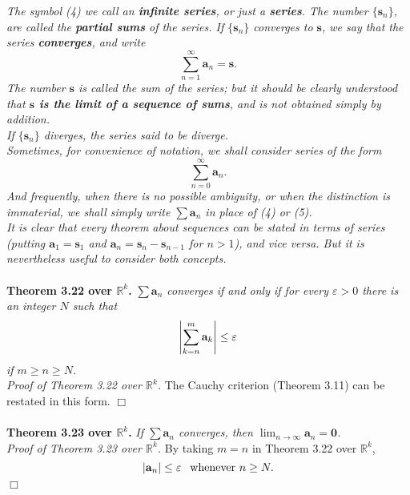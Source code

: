 \documentclass{article}
\begin{document}
\emph{The symbol (4) we call an \textbf{infinite series}, or just a \textbf{series}.
The number $\{ \mathbf{s}_n \}$, are called the \textbf{partial sums} of the series.
If $\{ \mathbf{s}_n \}$ converges to $\mathbf{s}$,
we say that the series \textbf{converges}, and write
\[
  \sum_{n=1}^{\infty} \mathbf{a}_n = \mathbf{s}.
\]
The number $\mathbf{s}$ is called the sum of the series;
but it should be clearly understood that
\textbf{$\mathbf{s}$ is the limit of a sequence of sums},
and is not obtained simply by addition.} \\

\emph{If $\{ \mathbf{s}_n \}$ diverges, the series said to be diverge.} \\

\emph{Sometimes, for convenience of notation, we shall consider series of the form
\[
  \sum_{n=0}^{\infty} \mathbf{a}_n. \tag{5}
\]
And frequently, when there is no possible ambiguity,
or when the distinction is immaterial, we shall simply write $\sum \mathbf{a}_n$
in place of (4) or (5).} \\

\emph{It is clear that every theorem about sequences can be stated in terms of
series
(putting $\mathbf{a}_1 = \mathbf{s}_1$
and $\mathbf{a}_n = \mathbf{s}_n - \mathbf{s}_{n-1}$ for $n > 1$),
and vice versa.
But it is nevertheless useful to consider both concepts.} \\\\



\textbf{Theorem 3.22 over $\mathbb{R}^k$.}
\emph{$\sum \mathbf{a}_n$ converges if and only if for every $\varepsilon > 0$
there is an integer $N$ such that
$$\abs{ \sum_{k=n}^m \mathbf{a}_k } \leq \varepsilon$$
if $m \geq n \geq N$.} \\

\emph{Proof of Theorem 3.22 over $\mathbb{R}^k$.}
The Cauchy criterion (Theorem 3.11) can be restated in this form.
$\Box$ \\\\



\textbf{Theorem 3.23 over $\mathbb{R}^k$.}
\emph{If $\sum \mathbf{a}_n$ converges,
then $\lim_{n \to \infty} \mathbf{a}_n = \mathbf{0}$.} \\

\emph{Proof of Theorem 3.23 over $\mathbb{R}^k$.}
By taking $m=n$ in Theorem 3.22 over $\mathbb{R}^k$,
$$\abs{ \mathbf{a}_n } \leq \varepsilon \:\: \text{ whenever } n \geq N.$$
$\Box$ \\\\
\end{document}

